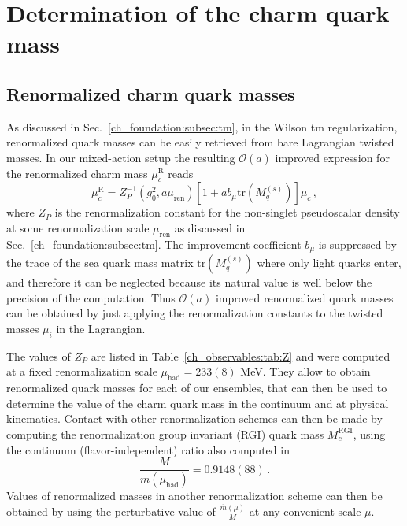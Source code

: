 \section{Determination of the charm quark mass}
\label{sec:mc}

\subsection{Renormalized charm quark masses}

%
As discussed in Sec.~\ref{ch_foundation:subsec:tm}, in the Wilson tm regularization, renormalized quark masses can be easily retrieved from bare Lagrangian twisted masses. In our mixed-action setup the resulting $\mathcal{O}(a)$ improved expression for the renormalized  charm mass $\mu^{\textrm{R}}_c$ reads
\begin{equation}
	\mu^{\textrm{R}}_c=Z_P^{-1}(g_0^2,a\mu_{\textrm{ren}})\left[1+a\overline{b}_\mu\textrm{tr}\left(M_q^{(s)}\right)\right]\mu_c\,,
	\label{eq:renormalized_charm_mass}
\end{equation}
where $Z_P$ is the renormalization constant for the non-singlet
pseudoscalar density at some renormalization scale $\mu_{\textrm{ren}}$ as discussed in Sec.~\ref{ch_foundation:subsec:tm}.
%
The improvement coefficient $\overline{b}_{\mu}$ is suppressed by the trace of the sea quark mass matrix $\textrm{tr}\left(M_q^{(s)}\right)$ where only light quarks enter, and therefore it can be neglected because its natural value is well below the precision of the computation. Thus $\mathcal{O}(a)$ improved renormalized quark masses can be obtained by just applying the renormalization constants to the twisted masses $\mu_i$ in the Lagrangian.
%

The values of $Z_P$ are listed in Table~\ref{ch_observables:tab:Z} and were computed at a fixed renormalization scale $\mu_{\textrm{had}}=233(8)$ MeV. They allow to obtain renormalized quark masses for each of our ensembles, that can then
be used to determine the value of the charm quark mass in the continuum and at physical kinematics.
%
Contact with other renormalization schemes can then be made by computing the renormalization
group invariant (RGI) quark mass $M_c^{\mathrm{RGI}}$, using the continuum (flavor-independent)
ratio also computed in~\cite{Campos:2018ahf}
\begin{equation}
	\frac{M}{\overline{m}(\mu_{\mathrm{had}})} = 0.9148(88)\,.
	\label{eq:rgi_running_factor}
\end{equation}
%
Values of renormalized masses in another renormalization scheme can then be obtained by
using the perturbative value of $\frac{\overline{m}(\mu)}{M}$ at any convenient scale $\mu$.
%

